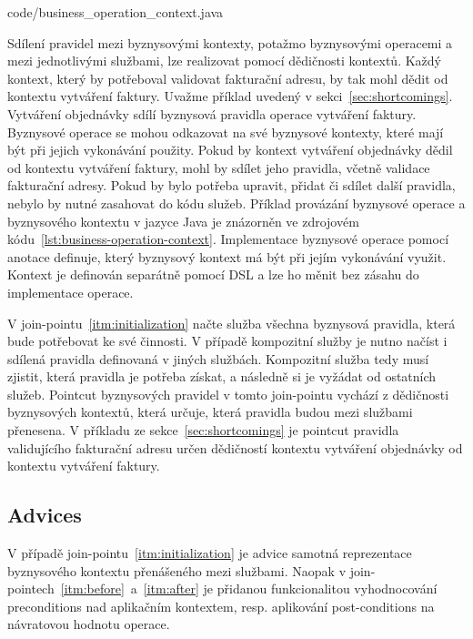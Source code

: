 
{code/business_operation_context.java}

Sdílení pravidel mezi byznysovými kontexty, potažmo byznysovými operacemi a mezi jednotlivými službami,
lze realizovat pomocí dědičnosti kontextů. Každý kontext, který by potřeboval validovat fakturační
adresu, by tak mohl dědit od kontextu vytváření faktury. Uvažme příklad uvedený v sekci~\ref{sec:shortcomings}.
Vytváření objednávky sdílí byznysová pravidla operace vytváření faktury. Byznysové operace se mohou odkazovat
na své byznysové kontexty, které mají být při jejich vykonávání použity. Pokud by kontext vytváření objednávky
dědil od kontextu vytváření faktury, mohl by sdílet jeho pravidla, včetně validace fakturační adresy. Pokud by bylo
potřeba upravit, přidat či sdílet další pravidla, nebylo by nutné zasahovat do kódu služeb. Příklad provázání
byznysové operace a byznysového kontextu v jazyce Java je znázorněn ve zdrojovém kódu~\ref{lst:business-operation-context}.
Implementace byznysové operace pomocí anotace  definuje, který byznysový kontext má být
při jejím vykonávání využit. Kontext je definován separátně pomocí \gls{DSL} a lze ho měnit bez zásahu do implementace
operace.

V join-pointu~\ref{itm:initialization} načte služba všechna byznysová pravidla, která
bude potřebovat ke své činnosti. V případě kompozitní služby je nutno načíst i sdílená pravidla
definovaná v jiných službách. Kompozitní služba tedy musí zjistit, která pravidla je potřeba získat,
a následně si je vyžádat od ostatních služeb. Pointcut byznysových pravidel v tomto join-pointu vychází
z dědičnosti byznysových kontextů, která určuje, která pravidla budou mezi službami přenesena.
V příkladu ze sekce~\ref{sec:shortcomings} je pointcut pravidla validujícího fakturační adresu
určen dědičností kontextu vytváření objednávky od kontextu vytváření faktury.


\subsection{Advices}

V případě join-pointu~\ref{itm:initialization} je advice samotná reprezentace byznysového
kontextu přenášeného mezi službami. Naopak v join-pointech~\ref{itm:before}~a~\ref{itm:after}
je přidanou funkcionalitou vyhodnocování preconditions nad aplikačním kontextem, resp. aplikování
post-conditions na návratovou hodnotu operace.

